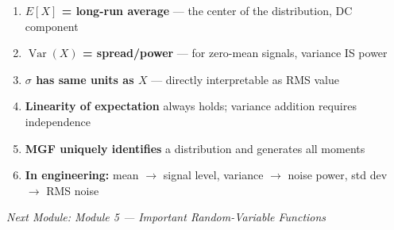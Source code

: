 
\begin{enumerate}
\def\labelenumi{\arabic{enumi}.}
\tightlist
\item
  \textbf{$E[X]$ = long-run average} — the center of the distribution, DC component
\item
  \textbf{$\operatorname{Var}(X)$ = spread/power} — for zero-mean signals, variance IS power
\item
  \textbf{$\sigma$ has same units as $X$} — directly interpretable as RMS value
\item
  \textbf{Linearity of expectation} always holds; variance addition requires independence
\item
  \textbf{MGF uniquely identifies} a distribution and generates all moments
\item
  \textbf{In engineering:} mean \ensuremath{\to} signal level, variance \ensuremath{\to} noise power, std dev \ensuremath{\to} RMS noise
\end{enumerate}

\emph{Next Module: {Module 5 — Important Random-Variable Functions}}
